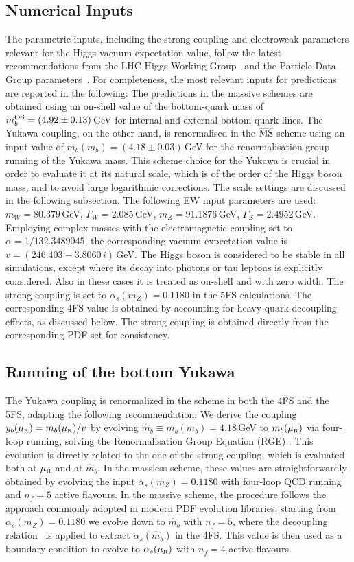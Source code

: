 \documentclass[11pt,a4paper]{article}
\begin{document}
\subsection{Numerical Inputs}
The parametric inputs, including the strong coupling and electroweak parameters relevant for the Higgs vacuum expectation value, follow the latest recommendations from the LHC Higgs Working Group~\cite{Karlberg:2024zxx} and the Particle Data Group parameters~\cite{ParticleDataGroup:2024cfk}. For completeness, the most relevant inputs for \bbH{} predictions are reported in the following: The predictions in the massive schemes are obtained using
an on-shell value of the bottom-quark mass of $m_b^{\rm OS}=(4.92\pm0.13)$\,GeV for internal and external bottom quark lines.
The Yukawa coupling, on the other hand, is renormalised in the $\overline{\text{MS}}{}$ scheme using an input value of $m_b(m_b)=(4.18\pm0.03)$\,GeV
for the renormalisation group running of the Yukawa mass. This scheme choice for the Yukawa is crucial in order to evaluate it at its natural
scale, which is of the order of the Higgs boson mass, and to avoid large logarithmic corrections. The scale settings are discussed in the following subsection.
The following EW input parameters are used: $m_W = 80.379$\,GeV, $\Gamma_W=2.085$\,GeV, $m_Z = 91.1876$\,GeV, $\Gamma_Z=2.4952$\,GeV. Employing complex masses with the electromagnetic coupling set to $\alpha=1/132.3489045$, the corresponding vacuum expectation value is $v=(246.403-3.8060\,i)$\,GeV.
The Higgs boson is considered to be stable in all simulations,
except where its decay into photons or tau leptons is explicitly considered. 
Also in these cases it is treated as on-shell and with zero width.
The strong coupling is set to $\alpha_s(m_Z) = 0.1180$ 
in the 5FS calculations. The corresponding 4FS value is obtained 
by accounting for heavy-quark decoupling effects, as discussed below.
The strong coupling is obtained directly from the corresponding PDF set
for consistency.

\subsection{Running of the bottom Yukawa}
The Yukawa coupling is renormalized in the \MSbar{} scheme in both the 4FS and the 5FS, adapting the following recommendation: We derive the coupling $y_b(\muR)=m_b(\muR)/v$ by 
evolving $\hat{m}_b\equiv m_b(m_b)=4.18$\,GeV to $m_b(\muR)$ via four-loop running, solving the Renormalisation Group Equation (RGE) \cite{harlander:2002wh,baikov_2014}. 
This evolution is directly related to the one of the strong coupling, which is evaluated both at $\muR$ and at $\hat{m}_b$. 
In the massless scheme, these values are straightforwardly obtained by evolving the input $\alpha_s(m_Z) = 0.1180$ with four-loop QCD running and $n_f = 5$ active flavours.
In the massive scheme, the procedure follows the approach commonly adopted in modern PDF evolution libraries: starting from $\alpha_s(m_Z) = 0.1180$ we evolve down to $\hat{m}_b$
with $n_f = 5$, where the decoupling relation~\cite{vogt:2004ns} is applied to extract $\alpha_s(\hat{m}_b)$ in the 4FS. 
This value is then used as a boundary condition to evolve to $\alpha_s(\muR)$ with $n_f = 4$ active flavours.
\end{document}
